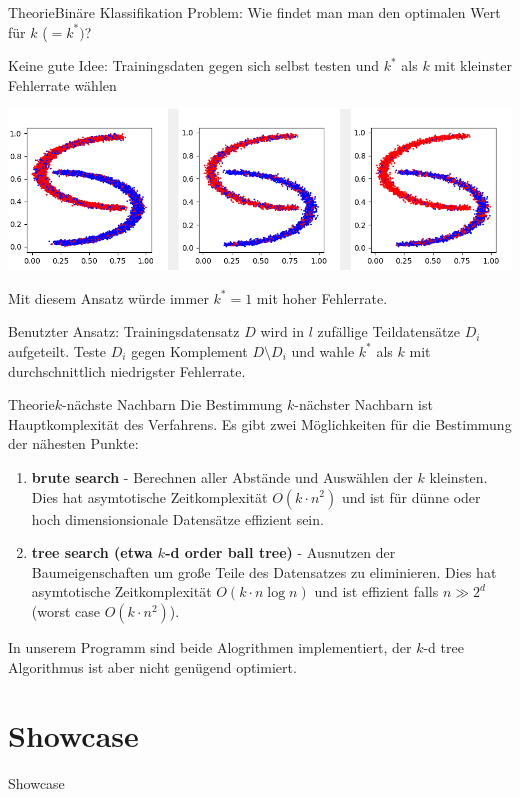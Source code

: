 \documentclass[9pt]{beamer}
\begin{document}
\begin{frame}{Theorie}{Binäre Klassifikation}
Problem: Wie findet man man den optimalen Wert für $k$ ($=k^*)$?

Keine gute Idee: Trainingsdaten gegen sich selbst testen und $k^*$ als $k$ mit kleinster Fehlerrate wählen
\begin{center}\includegraphics[scale=0.40]{assets/naive_approach.png}\end{center}
Mit diesem Ansatz würde immer $k^*=1$ mit hoher Fehlerrate.

Benutzter Ansatz: Trainingsdatensatz $D$ wird in $l$ zufällige Teildatensätze $D_i$ aufgeteilt. Teste $D_i$ gegen Komplement $D \setminus D_i$ und wahle $k^*$ als $k$ mit durchschnittlich niedrigster Fehlerrate.
\end{frame}

\begin{frame}{Theorie}{$k$-nächste Nachbarn}
Die Bestimmung $k$-nächster Nachbarn ist Hauptkomplexität des Verfahrens. Es gibt zwei Möglichkeiten für die Bestimmung der nähesten Punkte:
\begin{enumerate}
\item \textbf{brute search} - Berechnen aller Abstände und Auswählen der $k$ kleinsten. Dies hat asymtotische Zeitkomplexität $O(k\cdot n^2)$ und ist für dünne oder hoch dimensionsionale Datensätze effizient sein.
\item \textbf{tree search (etwa $k$-d order ball tree)} - Ausnutzen der Baumeigenschaften um große Teile des Datensatzes zu eliminieren. Dies hat asymtotische Zeitkomplexität $O(k \cdot n \log n)$ und ist effizient falls $n \gg 2^d$ (worst case $O(k\cdot n^2)$).
\end{enumerate}
In unserem Programm sind beide Alogrithmen implementiert, der $k$-d tree Algorithmus ist aber nicht genügend optimiert.
\end{frame}

\section{Showcase}
\begin{frame}{Showcase}{}

\end{frame}
\end{document}
